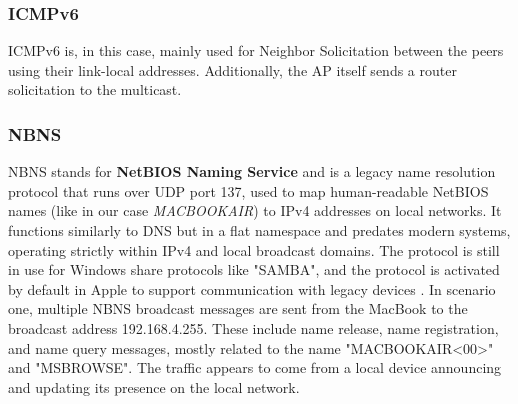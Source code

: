 \documentclass[sigconf,nonacm]{acmart}
\begin{document}
\subsubsection{ICMPv6}

ICMPv6 is, in this case, mainly used for Neighbor Solicitation between the peers using their link-local addresses. 
Additionally, the AP itself sends a router solicitation to the multicast.



\subsubsection{NBNS}
\label{nbns}
NBNS stands for \textbf{NetBIOS Naming Service} and is a legacy name resolution protocol that runs over UDP port 137, used to map human-readable NetBIOS names (like in our case \textit{MACBOOKAIR}) to IPv4 addresses on local networks. It functions similarly to DNS but in a flat namespace and predates modern systems, operating strictly within IPv4 and local broadcast domains. The protocol is still in use for Windows share protocols like "SAMBA", and the protocol is activated by default in Apple to support communication with legacy devices \cite{apple:102050, wireshark:nbns}. 
In scenario one, multiple NBNS  broadcast messages are sent from the MacBook to the broadcast address 192.168.4.255. These include name release, name registration, and name query messages, mostly related to the name "MACBOOKAIR<00>" and "MSBROWSE". The traffic appears to come from a local device announcing and updating its presence on the local network.











\end{document}
